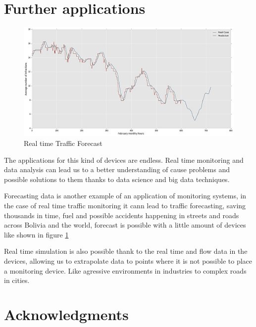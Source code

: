 \documentclass[fleqn,12pt]{SelfArx} %
\begin{document}


\section{Further applications}

\begin{figure}[b]\centering %
	\includegraphics[width=\linewidth]{images/data}
	\caption{Real time Traffic Forecast}
	\label{fig:forecast}
\end{figure}
 
The applications for this kind of devices are endless. Real time monitoring and data analysis can lead us to a better understanding of cause problems and possible solutions to them thanks to data science and big data techniques.

Forecasting data is another example of an application of monitoring systems, in the case of real time traffic monitoring it cann lead to traffic forecasting, saving thousands in time, fuel and possible accidents happening in streets and roads across Bolivia and the world, forecast is possible with a little amount of devices like shown in figure \ref{fig:forecast}



Real time simulation is also possible thank to the real time and flow data in the devices, allowing us to extrapolate data to points where it is not possible to place a monitoring device. Like agressive environments in industries to complex roads in cities.

\section*{Acknowledgments} %
\end{document}

